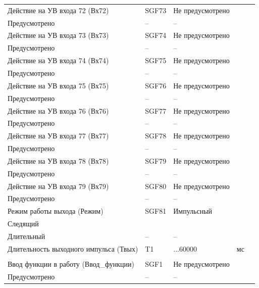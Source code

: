 \begin{longtable}{|>{\centering\arraybackslash}m{5.3cm}|>{\centering\arraybackslash}m{3.3cm}|>{\centering\arraybackslash}m{4.2cm}|>{\centering\arraybackslash}m{1.8cm}|>{\centering\arraybackslash}m{1cm}|}
\hline
\centering Действие на УВ входа 72 (Вх72)  & \centering SGF73 & \centering Не предусмотрено \\ Предусмотрено & \centering -- & \centering \arraybackslash -- \\
\hline
\centering Действие на УВ входа 73 (Вх73)  & \centering SGF74 & \centering Не предусмотрено \\ Предусмотрено & \centering -- & \centering \arraybackslash -- \\
\hline
\centering Действие на УВ входа 74 (Вх74)  & \centering SGF75 & \centering Не предусмотрено \\ Предусмотрено & \centering -- & \centering \arraybackslash -- \\
\hline
\centering Действие на УВ входа 75 (Вх75)  & \centering SGF76 & \centering Не предусмотрено \\ Предусмотрено & \centering -- & \centering \arraybackslash -- \\
\hline
\centering Действие на УВ входа 76 (Вх76)  & \centering SGF77 & \centering Не предусмотрено \\ Предусмотрено & \centering -- & \centering \arraybackslash -- \\
\hline
\centering Действие на УВ входа 77 (Вх77)  & \centering SGF78 & \centering Не предусмотрено \\ Предусмотрено & \centering -- & \centering \arraybackslash -- \\
\hline
\centering Действие на УВ входа 78 (Вх78)  & \centering SGF79 & \centering Не предусмотрено \\ Предусмотрено & \centering -- & \centering \arraybackslash -- \\
\hline
\centering Действие на УВ входа 79 (Вх79)  & \centering SGF80 & \centering Не предусмотрено \\ Предусмотрено & \centering -- & \centering \arraybackslash -- \\
\hline
\centering Режим работы выхода (Режим)  & \centering SGF81 & \centering Импульсный \\ Следящий \\ Длительный & \centering -- & \centering \arraybackslash -- \\
\hline
\centering Длительность выходного импульса (Твых)  & \centering T1 & \centering 50...60000 & \centering мс & \centering \arraybackslash 10 \\
\hline
\multicolumn{5}{|c|}{ УВ2 } \\ \hline 
\centering Ввод функции в работу (Ввод\_функции)  & \centering SGF1 & \centering Не предусмотрено \\ Предусмотрено & \centering -- & \centering \arraybackslash -- \\

\end{longtable}
